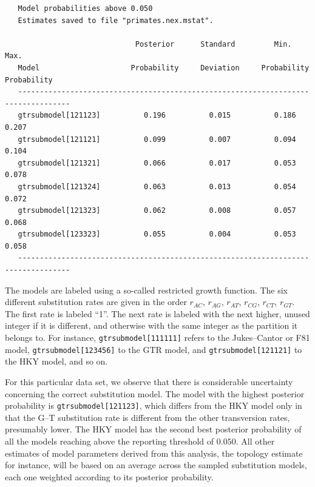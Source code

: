\documentclass[12pt]{book}
\newcommand{\ttt}[1]{\texttt{#1}}
\begin{document}
\begin{singlespacing}
\footnotesize
\begin{verbatim}
   Model probabilities above 0.050
   Estimates saved to file "primates.nex.mstat".

                              Posterior      Standard         Min.           Max.   
   Model                     Probability     Deviation     Probability    Probability
   ----------------------------------------------------------------------------------
   gtrsubmodel[121123]          0.196          0.015          0.186          0.207
   gtrsubmodel[121121]          0.099          0.007          0.094          0.104
   gtrsubmodel[121321]          0.066          0.017          0.053          0.078
   gtrsubmodel[121324]          0.063          0.013          0.054          0.072
   gtrsubmodel[121323]          0.062          0.008          0.057          0.068
   gtrsubmodel[123323]          0.055          0.004          0.053          0.058
   ----------------------------------------------------------------------------------
\end{verbatim}
\end{singlespacing}
\normalsize

The models are labeled using a so-called restricted growth function. The six different substitution
rates are given in the order $r_{AC}$, $r_{AG}$, $r_{AT}$, $r_{CG}$, $r_{CT}$, $r_{GT}$. The first rate is
labeled ``1''. The next rate is labeled with the next higher, unused integer if it is different,
and otherwise with the same integer as the partition it belongs to. For instance,
\ttt{gtrsubmodel[111111]} refers to the Jukes--Cantor or F81 model, \ttt{gtrsubmodel[123456]} to
the GTR model, and \ttt{gtrsubmodel[121121]} to the HKY model, and so on.

For this particular data set, we observe that there is considerable uncertainty concerning the
correct substitution model. The model with the highest posterior probability is
\ttt{gtrsubmodel[121123]}, which differs from the HKY model only in that the G--T substitution rate
is different from the other transversion rates, presumably lower. The HKY model has the second best
posterior probability of all the models reaching above the reporting threshold of $0.050$. All other
estimates of model parameters derived from this analysis, the topology estimate for instance, will
be based on an average across the sampled substitution models, each one weighted according to its
posterior probability.
\end{document}
